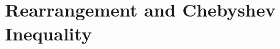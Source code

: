 \documentclass{subfile}
\begin{document}
	\section{Rearrangement and Chebyshev Inequality}\label{sec:rearragement}
\end{document}
